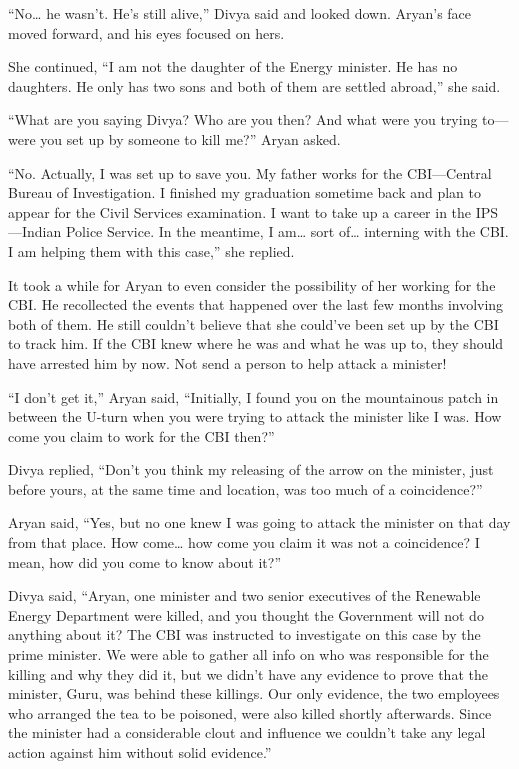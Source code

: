 “No… he wasn't. He's still alive,” Divya said and looked down. Aryan's face
moved forward, and his eyes focused on hers.

She continued, “I am not the daughter of the Energy minister. He has no
daughters. He only has two sons and both of them are settled abroad,” she said.

“What are you saying Divya? Who are you then? And what were you trying to—were
you set up by someone to kill me?” Aryan asked.

“No. Actually, I was set up to save you. My father works for the CBI—Central
Bureau of Investigation. I finished my graduation sometime back and plan to
appear for the Civil Services examination. I want to take up a career in the 
IPS—Indian Police Service. In the meantime, I am… sort of… interning with
the CBI. I am helping them with this case,” she replied.

It took a while for Aryan to even consider the possibility of her working for
the CBI. He recollected the events that happened over the last few months
involving both of them. He still couldn't believe that she could've been set up
by the CBI to track him. If the CBI knew where he was and what he was up to,
they should have arrested him by now. Not send a person to help attack a
minister!

“I don't get it,” Aryan said, “Initially, I found you on the mountainous patch
in between the U-turn when you were trying to attack the minister like I was.
How come you claim to work for the CBI then?”

Divya replied, “Don't you think my releasing of the arrow on the minister, just
before yours, at the same time and location, was too much of a coincidence?”

Aryan said, “Yes, but no one knew I was going to attack the minister on that day
from that place. How come… how come you claim it was not a coincidence? I
mean, how did you come to know about it?”

Divya said, “Aryan, one minister and two senior executives of the Renewable
Energy Department were killed, and you thought the Government will not do
anything about it? The CBI was instructed to investigate on this case by the
prime minister. We were able to gather all info on who was responsible for the
killing and why they did it, but we didn't have any evidence to prove that the
minister, Guru, was behind these killings. Our only evidence, the two employees
who arranged the tea to be poisoned, were also killed shortly afterwards. Since
the minister had a considerable clout and influence we couldn't take any legal
action against him without solid evidence.”

